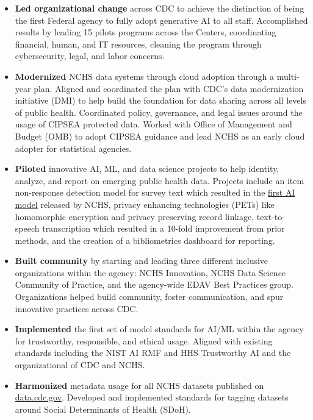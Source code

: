 \documentclass[]{scrartcl}
\begin{document}
\begin{cleanCV}
{\begin{itemize}
  \item \textbf{Led organizational change} across CDC to achieve the distinction of being the first Federal agency to fully adopt generative AI to all staff. Accomplished results by leading 15 pilots programs across the Centers, coordinating financial, human, and IT resources, cleaning the program through cybersecurity, legal, and labor concerns.

  \item \textbf{Modernized} NCHS data systems through cloud adoption through a multi-year plan. Aligned and coordinated the plan with CDC's data modernization initiative (DMI) to help build the foundation for data sharing across all levels of public health. Coordinated policy, governance, and legal issues around the usage of CIPSEA protected data. Worked with Office of Management and Budget (OMB) to adopt CIPSEA guidance and lead NCHS as an early cloud adopter for statistical agencies.
    
  \item \textbf{Piloted} innovative AI, ML, and data science projects to help identity, analyze, and report on emerging public health data. Projects include an item non-response detection model for survey text which resulted in the \href{https://www.cdc.gov/nchs/data-science/SANDS-model-context.htm}{first AI model} released by NCHS, privacy enhancing technologies (PETs) like homomorphic encryption and privacy preserving record linkage, text-to-speech transcription which resulted in a 10-fold improvement from prior methods, and the creation of a bibliometrics dashboard for reporting.

      \item \textbf{Built community} by starting and leading three different inclusive organizations within the agency: NCHS Innovation, NCHS Data Science Community of Practice, and the agency-wide EDAV Best Practices group. Organizations helped build community, foster communication, and spur innovative practices across CDC.
    
  \item \textbf{Implemented} the first set of model standards for AI/ML within the agency for trustworthy, responsible, and ethical usage. Aligned with existing standards including the NIST AI RMF and HHS Trustworthy AI and the organizational of CDC and NCHS. 

  \item \textbf{Harmonized} metadata usage for all NCHS datasets published on \href{https://data.cdc.gov/browse?category=NCHS}{data.cdc.gov}. Developed and implemented standards for tagging datasets around Social Determinants of Health (SDoH).
    

\end{itemize}}
\end{cleanCV}
\end{document}
